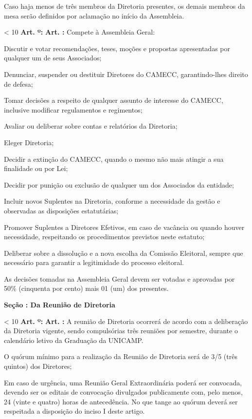 \documentclass[capitulo]{br-lex}
\newcounter{tit}
\newcounter{sec}
\newcounter{art}
\newcommand{\secao}[1]{
    \vspace{20pt}
    \textbf{Seção \Roman{sec}: #1}
    \stepcounter{sec}
}
\renewcommand{\artigo}{
    \ifnum\value{art} < 10
        \textbf{Art. \arabic{art}º:}
    \else
        \textbf{Art. \arabic{art}:}
    \fi
    \stepcounter{art}
    \setcounter{inciso}{0}
    \setcounter{paragrafo}{0}
}
\begin{document}
\paragrafo Caso haja menos de três membros da Diretoria presentes, os demais membros da mesa serão definidos por aclamação no início da Assembleia.

\artigo Compete à Assembleia Geral:

\inciso Discutir e votar recomendações, teses, moções e propostas apresentadas por qualquer um de seus Associados;

\inciso Denunciar, suspender ou destituir Diretores do CAMECC, garantindo-lhes direito de defesa;

\inciso Tomar decisões a respeito de qualquer assunto de interesse do CAMECC, inclusive modificar regulamentos e regimentos;

\inciso Avaliar ou deliberar sobre contas e relatórios da Diretoria;

\inciso Eleger Diretoria;

\inciso Decidir a extinção do CAMECC, quando o mesmo não mais atingir a sua finalidade ou por Lei;

\inciso Decidir por punição ou exclusão de qualquer um dos Associados da entidade;

\inciso Incluir novos Suplentes na Diretoria, conforme a necessidade da gestão e observadas as disposições estatutárias;

\inciso Promover Suplentes a Diretores Efetivos, em caso de vacância ou quando houver necessidade, respeitando os procedimentos previstos neste estatuto;

\inciso Deliberar sobre a dissolução e a nova escolha da Comissão Eleitoral, sempre que necessário para garantir a legitimidade do processo eleitoral.

\paragrafounico As decisões tomadas na Assembleia Geral devem ser votadas e aprovadas por 50\% (cinquenta por cento) mais 01 (um) dos presentes.

\secao{Da Reunião de Diretoria}

\artigo A reunião de Diretoria ocorrerá de acordo com a deliberação da Diretoria vigente, sendo compulsórias três reuniões por semestre, durante o calendário letivo da Graduação da UNICAMP.

\inciso O quórum mínimo para a realização da Reunião de Diretoria será de 3/5 (três quintos) dos Diretores;

\inciso Em caso de urgência, uma Reunião Geral Extraordinária poderá ser convocada, devendo ser os editais de convocação divulgados publicamente com, pelo menos, 24 (vinte e quatro) horas de antecedência. No que tange ao quórum deverá ser respeitada a disposição do inciso I deste artigo.
\end{document}
